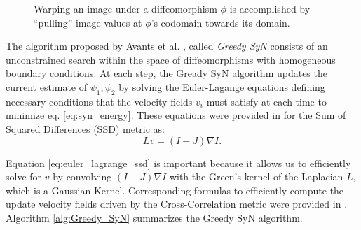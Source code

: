 \begin{figure}[H]
\centering
{}
\caption{Warping an image under a diffeomorphism $\phi$ is accomplished by ``pulling'' image values at $\phi$'s codomain towards its domain.}
\label{fig:pull_back}
\end{figure}


The algorithm proposed by Avants et al. \cite{Avants2011}, called {\it Greedy SyN} consists of an unconstrained search within the space of diffeomorphisms with homogeneous boundary
conditions. At each step, the Gready SyN algorithm updates the current estimate of $\psi_{1}, \psi_{2}$ by solving the Euler-Lagange equations defining necessary conditions
that the velocity fields $v_{i}$ must satisfy at each time to minimize eq. \ref{eq:syn_energy}. These equations were provided in \cite{Avants2006} for the Sum of Squared
Differences (SSD) metric as:
\begin{equation}\label{eq:euler_lagrange_ssd}
    Lv = (I - J)\nabla I.
\end{equation}

Equation \ref{eq:euler_lagrange_ssd} is important because it allows us to efficiently solve for $v$ by convolving $(I - J)\nabla I$ with the Green's kernel of the Laplacian $L$, which
is a Gaussian Kernel. Corresponding formulas to efficiently compute the update velocity fields driven by the Cross-Correlation metric were provided in \cite{Avants2009}.
Algorithm \ref{alg:Greedy_SyN} summarizes the Greedy SyN algorithm.


